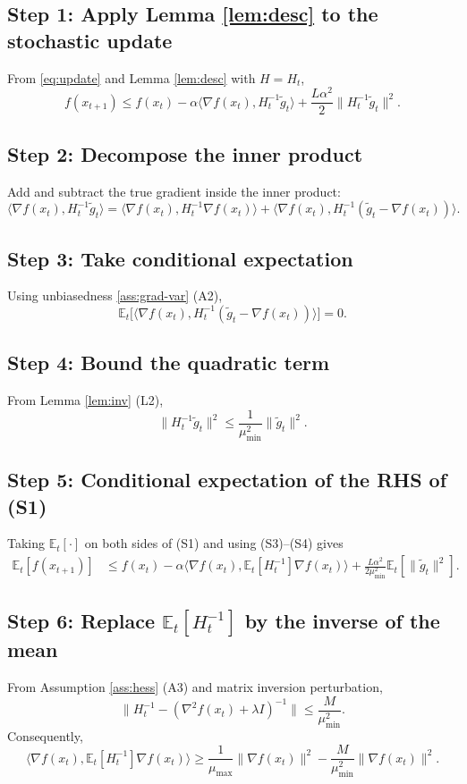 \documentclass{article}
\newcommand{\E}{\mathbb{E}}
\begin{document}
\subsection*{Step 1: Apply Lemma \ref{lem:desc} to the stochastic update}
From \eqref{eq:update} and Lemma \ref{lem:desc} with $H=H_t$,
\begin{equation}
f(x_{t+1})\le f(x_t)-\alpha\langle\nabla f(x_t),H_t^{-1}\tilde g_t\rangle
+\frac{L\alpha^{2}}{2}\|H_t^{-1}\tilde g_t\|^{2}.
\tag{S1}
\end{equation}

\subsection*{Step 2: Decompose the inner product}
Add and subtract the true gradient inside the inner product:
\[
\langle\nabla f(x_t),H_t^{-1}\tilde g_t\rangle
=
\langle\nabla f(x_t),H_t^{-1}\nabla f(x_t)\rangle
+
\langle\nabla f(x_t),H_t^{-1}(\tilde g_t-\nabla f(x_t))\rangle.
\tag{S2}
\]

\subsection*{Step 3: Take conditional expectation}
Using unbiasedness \eqref{ass:grad-var} (A2),
\[
\E_t\big[\langle\nabla f(x_t),H_t^{-1}(\tilde g_t-\nabla f(x_t))\rangle\big]=0.
\tag{S3}
\]

\subsection*{Step 4: Bound the quadratic term}
From Lemma \ref{lem:inv} (L2),
\[
\|H_t^{-1}\tilde g_t\|^{2}
\le \frac{1}{\mu_{\min}^{2}}\|\tilde g_t\|^{2}.
\tag{S4}
\]

\subsection*{Step 5: Conditional expectation of the RHS of (S1)}
Taking $\E_t[\cdot]$ on both sides of (S1) and using (S3)–(S4) gives
\[
\begin{aligned}
\E_t[f(x_{t+1})]
&\le f(x_t)-\alpha\langle\nabla f(x_t),\E_t[H_t^{-1}]\nabla f(x_t)\rangle
+\frac{L\alpha^{2}}{2\mu_{\min}^{2}}\E_t[\|\tilde g_t\|^{2}].
\end{aligned}
\tag{S5}
\]

\subsection*{Step 6: Replace $\E_t[H_t^{-1}]$ by the inverse of the mean}
From Assumption \ref{ass:hess} (A3) and matrix inversion perturbation,
\[
\big\|H_t^{-1}-(\nabla^{2}f(x_t)+\lambda I)^{-1}\big\|
\le \frac{M}{\mu_{\min}^{2}}.
\tag{S6}
\]
Consequently,
\[
\langle\nabla f(x_t),\E_t[H_t^{-1}]\nabla f(x_t)\rangle
\ge
\frac{1}{\mu_{\max}}\|\nabla f(x_t)\|^{2}
-\frac{M}{\mu_{\min}^{2}}\|\nabla f(x_t)\|^{2}.
\tag{S7}
\]
\end{document}
